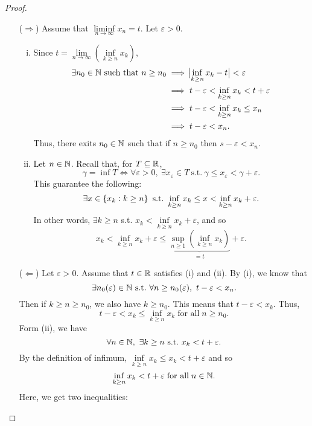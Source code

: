 \documentclass[11pt,openany]{article}
\begin{document}
\begin{proof}
\begin{enumerate}[(1)]
\begin{center}
\end{center}
\begin{itemize}
	\item[($\Rightarrow$)] Assume that $\liminf\limits_{n \to \infty} x_n=t$. Let $\varepsilon>0$. 
	\begin{enumerate}[(i)]
		\item Since $t=\lim\limits_{n\to\infty}\left(\inf\limits_{k\geq n}x_k\right)$, 
		\begin{align*}
			\exists n_0\in\mathbb{N}\ \text{such that}\ n\geq n_0&\implies\abs[1]{\inf\limits_{k\geq n}x_k-t}<\varepsilon \\
			& \implies t-\varepsilon< \inf\limits_{k\geq n} x_k<t+\varepsilon\\
			& \implies t-\varepsilon<\inf\limits_{k\geq n} x_k\leq x_n \\
			& \implies t-\varepsilon<x_n.
		\end{align*}
		Thus, there exits $n_0\in\mathbb{N}$ such that if $n\geq n_0$ then $s-\varepsilon<x_n$.
		\item Let $n\in\mathbb{N}$. Recall that, for $T\subseteq\mathbb{R}$, \[
		\boxed{\gamma=\inf T\iff\forall\varepsilon>0,\ \exists x_\varepsilon\in T\ \text{s.t.}\ \gamma\leq x_\varepsilon<\gamma+\varepsilon}.
		\] This guarantee the following: \[
		\exists x\in\set{x_k:k\geq n}\ \text{s.t.}\ \inf\limits_{k\geq n}x_k\leq x<\inf\limits_{k\geq n}x_k+\varepsilon.
		\] In other words, $\exists k\geq n$ s.t. $x_k<\inf\limits_{k\geq n}x_k+\varepsilon$, and so \[
		x_k<\inf\limits_{k\geq n}x_k+\varepsilon\leq\underbrace{\sup\limits_{n\geq 1}\left(\inf_{k\geq n}x_k\right)}_{=t}+\varepsilon.
		\]
		\end{enumerate}
	\item[($\Leftarrow$)] Let $\varepsilon>0$. Assume that $t\in\mathbb{R}$ satisfies (i) and (ii). By (i), we know that \[
	\exists n_0(\varepsilon)\in\N\ \text{s.t.}\ \forall n\geq n_0(\varepsilon),\ t-\varepsilon<x_n.
	\] Then if $k\geq n\geq n_0$, we also have $k\geq n_0$. This means that $t-\varepsilon<x_k$. Thus, \[
	t-\varepsilon< x_k\leq \inf\limits_{k\geq n}x_k\; \text{for all}\; n\geq n_0.
	\]
	Form (ii), we have \[
	\forall n\in\mathbb{N},\ \exists k\geq n\ \text{s.t.}\ x_k<t+\varepsilon.
	\] By the definition of infimum, $\inf\limits_{k\geq n} x_k\leq x_k<t+\varepsilon$ and so \[
	\inf\limits_{k\geq n} x_k < t+\varepsilon\; \text{for all}\; n\in\mathbb{N}.
	\] Here, we get two inequalities: \begin{itemize}

\end{itemize}
\end{itemize}
\end{enumerate}
\end{proof}
\end{document}
